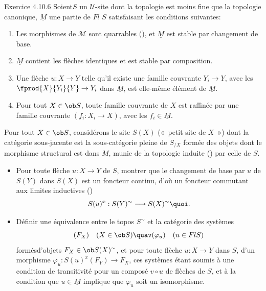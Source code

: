\documentclass[10pt]{../fichiers-configuration-latex/smfart}
\begin{document}
\begin{enonce*}[remark]{Exercice 4.10.6}
Soient\pageoriginale $S$ un $𝒰$-site dont la topologie est
moins fine que la topologie canonique, $\underline{M}$ une partie de
$Fl$ $S$ satisfaisant les conditions suivantes:
\begin{enumerate}
\renewcommand{\theenumi}{\alph{enumi}}
\renewcommand{\labelenumi}{\theenumi)}
\item Les morphismes de $ℳ$ sont quarrables (), et
$\underline{M}$ est stable par changement de base.

\item $\underline{M}$ contient les flèches identiques et est stable par
composition.

\item Une flèche $u:X\rightarrow Y$ telle qu'il existe une famille
couvrante $Y_i\rightarrow Y$, avec les $\fprod{X}{Y_i}{Y}\rightarrow
Y_i$ dans $\underline{M}$, est elle-même élément de $\underline{M}$.

\item Pour tout $X\in \ob S$, toute famille couvrante de $X$ est
raffinée par une famille couvrante $(f_i:X_i\rightarrow X)$, avec
les $f_i\in \underline{M}$.
\end{enumerate}

Pour tout $X\in \ob S$, considérons le site $S(X)$ (« petit site
de $X$ ») dont la catégorie sous-jacente est la sous-catégorie
pleine de $S_{/X}$ formée des objets dont le morphisme structural
est dans $\underline{M}$, munie de la topologie induite
() par celle de $S$.
\begin{itemize}
\item[$1^{\circ})$] Pour toute flèche $u:X\rightarrow Y$ de $S$,
montrer que le changement de base par $u$ de $S(Y)$ dans $S(X)$ est
un foncteur continu, d'où un foncteur commutant aux limites
inductives ()
$$
S(u)^x:S(Y)^{\sim}\longrightarrow S(X)^{\sim}{\quoi}.
$$

\item[$2^{\circ})$] Définir une équivalence entre le topos
$S^{\sim}$ et la catégorie des systèmes
$$
(F_X)\quad (X\in \ob S)\quav (\varphi_u)\quad (u\in Fl S)
$$
formés\pageoriginale d'objets $F_X\in \ob S(X)^{\sim}$, et pour
toute flèche $u:X\rightarrow Y$ dans $S$, d'un morphisme
$\varphi_u:S(u)^x(F_Y)\rightarrow F_X$, ces systèmes étant
soumis à une condition de transitivité pour un composé $v\circ
u$ de flèches de $S$, et à la condition que $u\in \underline{M}$ implique
que $\varphi_u$ soit un isomorphisme.


\end{itemize}
\end{enonce*}
\end{document}
